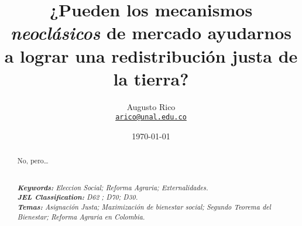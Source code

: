 \documentclass[11pt]{article}
\title{¿Pueden los mecanismos \textit{neoclásicos} de mercado  ayudarnos a lograr una redistribución justa de la tierra?
}
\author{Augusto Rico\\
    \href{mailto:arico@unal.edu.co}{\texttt{arico@unal.edu.co}}
    }
\date{\today}
\begin{document}
{ %
\maketitle
\begin{abstract}
\begin{center}No, pero\dots\\~\\\end{center} %
\noindent
\textit{\textbf{Keywords: }%
Eleccion Social; Reforma Agraria; Externalidades.} \\ %
\noindent
\textit{\textbf{JEL Classification: }%
D62	; D70; D30.}\\ %
\noindent
\textit{\textbf{Temas: }%
Asignación Justa; Maximización de bienestar social; Segundo Teorema del Bienestar; Reforma Agraria en Colombia.} \\ %


\end{abstract}





}
\end{document}

